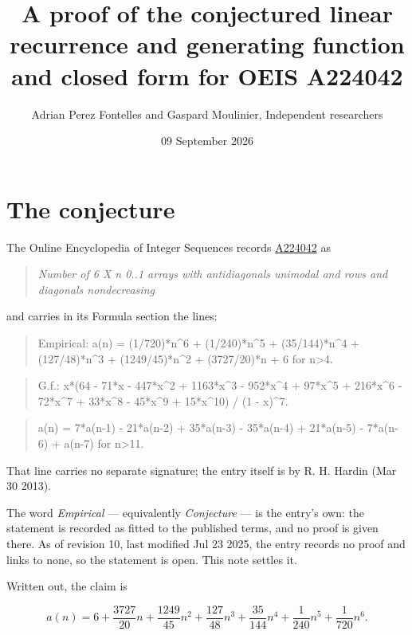 \documentclass[11pt]{article}
\title{A proof of the conjectured linear recurrence and generating function and closed form for OEIS A224042}
\author{Adrian Perez Fontelles and Gaspard Moulinier, Independent researchers}
\date{09 September 2026}
\theoremstyle{definition}
\begin{document}
\maketitle
\section{The conjecture}

The Online Encyclopedia of Integer Sequences records \href{https://oeis.org/A224042}{A224042} as

\begin{quote}\itshape Number of 6 X n 0..1 arrays with antidiagonals unimodal and rows and diagonals nondecreasing\end{quote}

and carries in its Formula section the lines:

\begin{quote}\ttfamily Empirical: a(n) = (1/720)*n\textasciicircum{}6 + (1/240)*n\textasciicircum{}5 + (35/144)*n\textasciicircum{}4 + (127/48)*n\textasciicircum{}3 + (1249/45)*n\textasciicircum{}2 + (3727/20)*n + 6 for n>4.\end{quote}

\begin{quote}\ttfamily G.f.: x*(64 - 71*x - 447*x\textasciicircum{}2 + 1163*x\textasciicircum{}3 - 952*x\textasciicircum{}4 + 97*x\textasciicircum{}5 + 216*x\textasciicircum{}6 - 72*x\textasciicircum{}7 + 33*x\textasciicircum{}8 - 45*x\textasciicircum{}9 + 15*x\textasciicircum{}10) / (1 - x)\textasciicircum{}7.\end{quote}

\begin{quote}\ttfamily a(n) = 7*a(n-1) - 21*a(n-2) + 35*a(n-3) - 35*a(n-4) + 21*a(n-5) - 7*a(n-6) + a(n-7) for n>11.\end{quote}

That line carries no separate signature; the entry itself is by R. H. Hardin (Mar 30 2013).

The word {\itshape Empirical} --- equivalently {\itshape Conjecture} --- is the entry's own: the statement is recorded as fitted to the published terms, and no proof is given there. As of revision 10, last modified Jul 23 2025, the entry records no proof and links to none, so the statement is open. This note settles it.

Written out, the claim is

\[a(n) = 6 + \frac{3727}{20}n + \frac{1249}{45}n^{2} + \frac{127}{48}n^{3} + \frac{35}{144}n^{4} + \frac{1}{240}n^{5} + \frac{1}{720}n^{6}.\]
\end{document}
